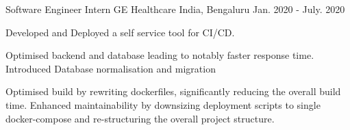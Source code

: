 \documentclass[11pt, a4paper]{awesome-cv}
\begin{document}
\makecvheader[C]


\begin{cventries}

  \cventry
    {Software Engineer Intern} %
    {GE Healthcare} %
    {India, Bengaluru} %
    {Jan. 2020 - July. 2020} %
    {
      \begin{cvitems} %
        \item {Developed and Deployed a self service tool for CI/CD.}
        \item {Optimised backend and database leading to notably faster response time. Introduced Database normalisation and migration}
        \item {Optimised build by rewriting dockerfiles, significantly reducing the overall build time. Enhanced maintainability by downsizing deployment scripts to single docker-compose and re-structuring the overall project structure.}
      \end{cvitems}
    }
\end{cventries}

\end{document}
